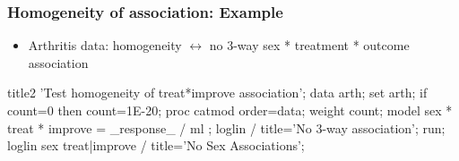 \begin{frame}[fragile]
  \frametitle{Homogeneity of association: Example}
  \begin{itemize}
	\item Arthritis data: homogeneity $\leftrightarrow$ no 3-way sex * treatment * outcome association
  \end{itemize}

\begin{Input}[fontsize=\footnotesize,label=\fbox{$\cdots$ \texttt{arthfreq.sas}},baselinestretch=0.8,firstnumber=26]
title2 'Test homogeneity of treat*improve association';
data arth;
   set arth;
   if count=0 then count=1E-20;   
proc catmod order=data;
   weight count;
   model sex * treat * improve = _response_ / ml ;
   loglin  / title='No 3-way association';
run;
   loglin sex treat|improve   / title='No Sex Associations';
\end{Input}
\end{frame}


